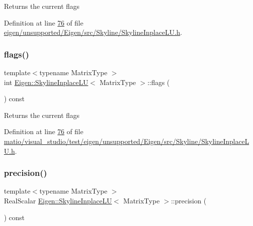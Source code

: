 \begin{DoxyReturn}{Returns}
the current flags 
\end{DoxyReturn}


Definition at line \hyperlink{eigen_2unsupported_2_eigen_2src_2_skyline_2_skyline_inplace_l_u_8h_source_l00076}{76} of file \hyperlink{eigen_2unsupported_2_eigen_2src_2_skyline_2_skyline_inplace_l_u_8h_source}{eigen/unsupported/\+Eigen/src/\+Skyline/\+Skyline\+Inplace\+L\+U.\+h}.

\mbox{\label{class_eigen_1_1_skyline_inplace_l_u_a5e491f7643c548ac81d3f4a7e432be19}} 
\subsubsection{\texorpdfstring{flags()}{flags()}\hspace{0.1cm}{\footnotesize\ttfamily [2/2]}}
{\footnotesize\ttfamily template$<$typename Matrix\+Type $>$ \\
int \hyperlink{class_eigen_1_1_skyline_inplace_l_u}{Eigen\+::\+Skyline\+Inplace\+LU}$<$ Matrix\+Type $>$\+::flags (\begin{DoxyParamCaption}{ }\end{DoxyParamCaption}) const\hspace{0.3cm}{\ttfamily [inline]}}

\begin{DoxyReturn}{Returns}
the current flags 
\end{DoxyReturn}


Definition at line \hyperlink{matio_2visual__studio_2test_2eigen_2unsupported_2_eigen_2src_2_skyline_2_skyline_inplace_l_u_8h_source_l00076}{76} of file \hyperlink{matio_2visual__studio_2test_2eigen_2unsupported_2_eigen_2src_2_skyline_2_skyline_inplace_l_u_8h_source}{matio/visual\+\_\+studio/test/eigen/unsupported/\+Eigen/src/\+Skyline/\+Skyline\+Inplace\+L\+U.\+h}.

\mbox{\label{class_eigen_1_1_skyline_inplace_l_u_a050bcbe008f2ddeea4f6d5872e0daca5}} 
\subsubsection{\texorpdfstring{precision()}{precision()}\hspace{0.1cm}{\footnotesize\ttfamily [1/2]}}
{\footnotesize\ttfamily template$<$typename Matrix\+Type $>$ \\
Real\+Scalar \hyperlink{class_eigen_1_1_skyline_inplace_l_u}{Eigen\+::\+Skyline\+Inplace\+LU}$<$ Matrix\+Type $>$\+::precision (\begin{DoxyParamCaption}{ }\end{DoxyParamCaption}) const\hspace{0.3cm}{\ttfamily [inline]}}

